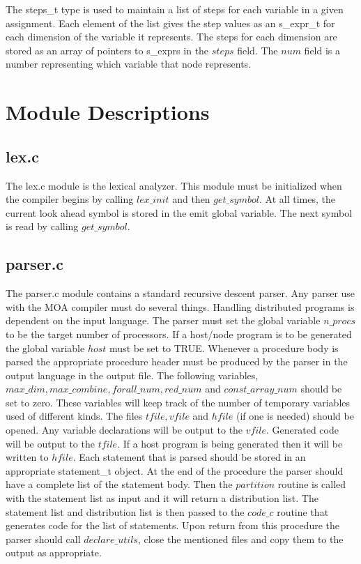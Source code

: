The steps\_t type is used to maintain a list of steps for each variable in
a given assignment.  Each element of the list gives the step values as an
s\_expr\_t for each dimension of the variable it represents.  The
steps for each dimension are stored as an array of pointers to s\_exprs in
the $steps$ field.  The $num$ field is a number representing which variable
that node represents.

\section{Module Descriptions}
\subsection{lex.c}
The lex.c module is the lexical analyzer.  This module must be initialized
when the compiler begins by calling $lex\_init$ and then $get\_symbol$.  At
all times, the current look ahead symbol is stored in the emit global variable.
The next symbol is read by calling $get\_symbol$.
\subsection{parser.c}
The parser.c module contains a standard recursive descent parser.  Any
parser use with the MOA compiler must do several things.  Handling distributed
programs is dependent on the input language.  The parser must set the
global variable $n\_procs$ to be the target number of processors.  If a
host/node program is to be generated the global variable $host$ must be
set to TRUE.  Whenever a
procedure body is parsed the appropriate procedure header must be produced
by the parser in the output language in the output file.  The following
variables, $max\_dim,max\_combine,forall\_num,red\_num$ and $const\_array\_num$
should be set to zero.  These variables will keep track of the number of
temporary variables used of different kinds.  The files $tfile,vfile$
and $hfile$ (if one is needed) should be opened.  Any variable declarations
will be output to the $vfile$.  Generated code will be output to the $tfile$.
If a host program is being generated then it will be written to $hfile$.
Each statement that is parsed should be stored in an appropriate 
statement\_t object.  At the end of the procedure the parser should have a
complete list of the statement body.  Then the $partition$ routine is
called with the statement list as input and it will return a distribution
list.  The statement list and distribution list is then passed to the 
$code\_c$ routine that generates code for the list of statements.  Upon return
from this procedure the parser should call $declare\_utils$, close the 
mentioned files and copy them to the output as appropriate.

